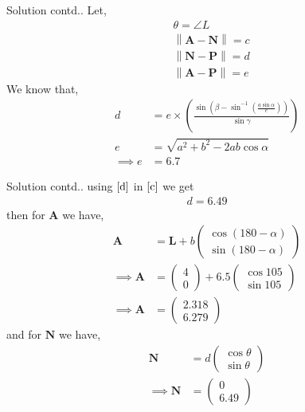 \documentclass{beamer}
\newcommand{\myvec}[1]{\ensuremath{\begin{pmatrix}#1\end{pmatrix}}}
\providecommand{\brak}[1]{\ensuremath{\left(#1\right)}}
\newcommand\norm[1]{\left\lVert#1\right\rVert}
\renewcommand{\vec}[1]{\mathbf{#1}}
\begin{document}
\begin{frame}{Solution contd..}
Let,
\begin{align}
    &\theta = \angle L\\
    &\norm{\vec{A}-\vec{N}} = c\\
    &\norm{\vec{N}-\vec{P}} = d\\
    &\norm{\vec{A}-\vec{P}} = e
\end{align}
We know that,
\begin{align}
        d &= e\times\brak{\frac{\sin{\brak{\beta-\sin^{-1}\brak{{\frac{a\sin\alpha}{e}}}}}}{\sin\gamma}}\label{c}\\
        e &= \sqrt{a^2+b^2-2ab\cos{\alpha}}\\
        \implies e &= 6.7\label{d}
\end{align}
\end{frame}
\begin{frame}{Solution contd..}
    using $\eqref{d}$ in $\eqref{c}$ we get
\begin{align}
    d=6.49
\end{align}
then for $\vec{A}$ we have,
\begin{align}
    \vec{A} &= \vec{L}+b\myvec{\cos{(180-\alpha)}\\
                              \sin{(180-\alpha)}}\\
    \implies \vec{A} &= \myvec{4\\
                              0}+6.5\myvec{\cos{105}\\
                                            \sin{105}}\\
    \implies \vec{A} &= \myvec{2.318\\
                              6.279}
\end{align}
and for $\vec{N}$ we have,
\begin{align}
    \vec{N} &= d\myvec{\cos{\theta}\\
                       \sin{\theta}}\\
    \implies \vec{N} &= \myvec{0\\
                               6.49}
\end{align}
\end{frame}
\end{document}
